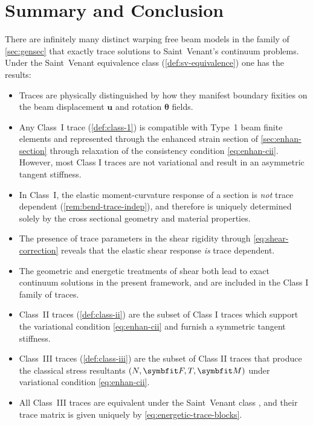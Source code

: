 \section{Summary and Conclusion}\label{sec:trace-summary}

There are infinitely many distinct warping free beam models in the family of \cref{sec:gensec} that exactly trace solutions to Saint~Venant's continuum problems. 
Under the Saint~Venant equivalence class (\cref{def:sv-equivalence}) one has the results:
\begin{itemize}
    \item Traces are physically distinguished by how they manifest boundary fixities on the beam displacement \(\bm{u}\) and rotation \(\bm{\theta}\) fields.
    \item Any Class~I trace (\cref{def:class-1}) is compatible with Type~1 beam finite elements and represented through the enhanced strain section of \cref{sec:enhan-section} through relaxation of the consistency condition \eqref{eq:enhan-cii}. %
    However, most Class I traces are not variational and result in an asymmetric tangent stiffness.

    \item In Class~I, the elastic moment-curvature response of a section is \emph{not} trace dependent (\cref{rem:bend-trace-indep}), and therefore is uniquely determined solely by the cross sectional geometry and material properties. 

    \item The presence of trace parameters in the shear rigidity through \eqref{eq:shear-correction} reveals that the elastic shear response \emph{is} trace dependent. 

    \item The geometric \citep{cowper1966shear} and energetic \citep{renton1991generalized} treatments of shear  
     both lead to exact continuum solutions in the present framework, and are included in the Class I family of traces. 
    
    \item Class~II traces (\cref{def:class-ii}) are the subset of Class I traces which support the variational condition \eqref{eq:enhan-cii} and furnish a symmetric tangent stiffness.
    \item Class~III traces (\cref{def:class-iii}) are the subset of Class II traces that produce the classical stress resultants \((N,\ShearForce,T,\bm{M})\) under variational condition \eqref{eq:enhan-cii}.%
    \item All Class~III traces are equivalent under the Saint~Venant class %
    , and their trace matrix is given uniquely by \eqref{eq:energetic-trace-blocks}.
\end{itemize}

